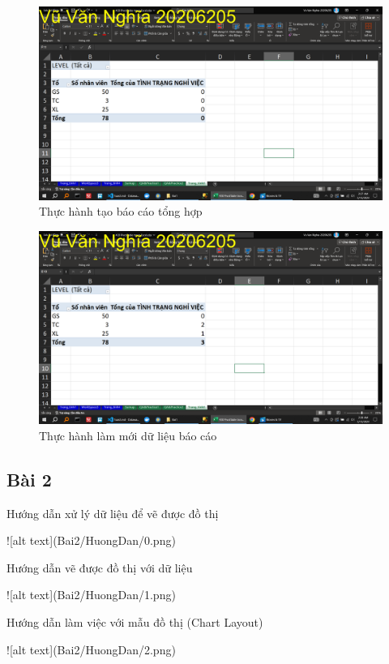 \documentclass{article}
\begin{document}
\begin{figure}[H]
    \centering
    \includegraphics[scale = 0.15]{Bai1/ThucHanh/1.png}
    \caption{Thực hành tạo báo cáo tổng hợp}
\end{figure}



\begin{figure}[H]
    \centering
    \includegraphics[scale = 0.15]{Bai1/ThucHanh/2.png}
    \caption{Thực hành làm mới dữ liệu báo cáo}
\end{figure}




\subsection{Bài 2}

\caption{Hướng dẫn xử lý dữ liệu để vẽ được đồ thị }
![alt text](Bai2/HuongDan/0.png)

\caption{Hướng dẫn vẽ được đồ thị với dữ liệu}
![alt text](Bai2/HuongDan/1.png)

\caption{Hướng dẫn làm việc với mẫu đồ thị (Chart Layout)}
![alt text](Bai2/HuongDan/2.png)
\end{document}

